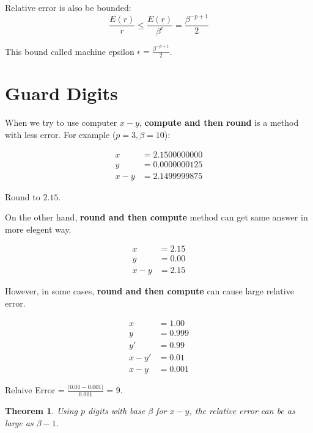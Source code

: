 \documentclass{article}
\newtheorem{theorem}{Theorem}
\begin{document}
        Relative error is also be bounded:
        \[
            \frac{E(r)}{r} \leq \frac{E(r)}{\beta^c} = \frac{\beta^{-p+1}}{2}
        \]
        
        This bound called machine epsilon $\epsilon = \frac{\beta^{-p+1}}{2}$.

        \section{Guard Digits}

        When we try to use computer $x - y$,
        \textbf{compute and then round} is a method with less error. For example ($p = 3, \beta = 10$):
        
        \begin{align}
            x     &= 2.1500000000 \\
            y     &= 0.0000000125 \\
            x - y &= 2.1499999875 
        \end{align}

        Round to $2.15$.

        On the other hand, \textbf{round and then compute}
        method can get same answer in more elegent way.

        \begin{align}
            x     &= 2.15 \\
            y     &= 0.00 \\
            x - y &= 2.15 
        \end{align}

        However, in some cases, \textbf{round and then compute}
        can cause large relative error.

        \begin{align}
            x      &= 1.00  \\
            y      &= 0.999 \\
            y'     &= 0.99  \\
            x - y' &= 0.01  \\
            x - y  &= 0.001
        \end{align}

        Relaive Error = $\frac{|0.01 - 0.001|}{0.001}$ = 9.

        \begin{theorem}
            Using $p$ digits with base $\beta$ for $x-y$, the relative error
            can be as large as $\beta - 1$.
        \end{theorem}
\end{document}
